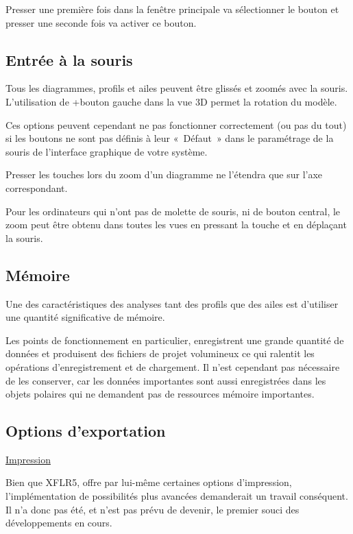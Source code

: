 \documentclass[a4paper,twoside,12pt,dvips]{article}
\begin{document}
Presser une première fois  dans la fenêtre principale va sélectionner le bouton  et presser une seconde fois  va activer ce bouton.

\subsection{Entrée à la souris}

Tous les diagrammes, profils et ailes peuvent être glissés et zoomés avec la souris. L’utilisation de +bouton gauche dans la vue 3D permet la rotation du modèle.

Ces options peuvent cependant ne pas fonctionner correctement (ou pas du tout) si les boutons ne sont pas définis à leur «~Défaut~» dans le paramétrage de la souris de l’interface graphique de votre système.

Presser les touches   lors du zoom d’un diagramme ne l’étendra que sur l’axe correspondant.

Pour les ordinateurs qui n’ont pas de molette de souris, ni de bouton central, le 
zoom peut être obtenu dans toutes les vues en pressant la touche  et en déplaçant la souris. 

\subsection{Mémoire}

Une des caractéristiques des analyses tant des profils que des ailes est d’utiliser une quantité significative de mémoire.

Les points de fonctionnement en particulier, enregistrent une grande quantité de 
données et produisent des fichiers de projet volumineux ce qui ralentit les opérations d’enregistrement et de chargement. Il n’est cependant pas nécessaire de les conserver, car les données importantes sont aussi enregistrées dans les objets polaires qui ne demandent pas de ressources mémoire importantes. 

\subsection{Options d’exportation}
\underline{Impression}

Bien que XFLR5, offre par lui-même certaines options d’impression, 
l’implémentation de possibilités plus avancées demanderait un travail 
conséquent. Il n’a donc pas été, et n’est pas prévu de devenir, le premier
souci des développements en cours.
\end{document}
